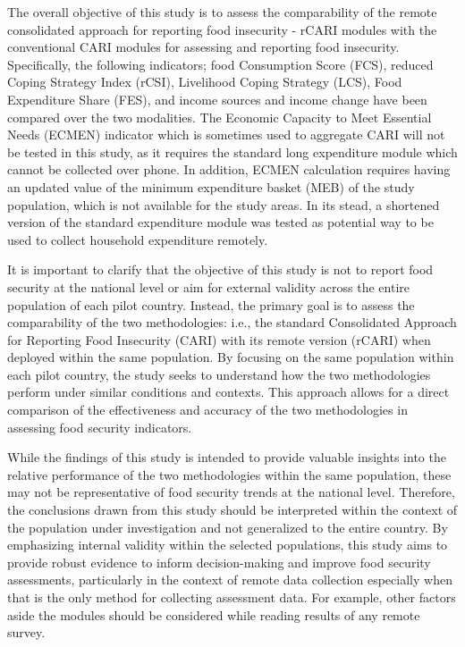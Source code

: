 \documentclass[11pt,harvard]{article}
\begin{document}
	The overall objective of this study is to assess the comparability of the remote consolidated approach for reporting food insecurity - rCARI modules with the conventional CARI modules for assessing and reporting food insecurity. Specifically, the following indicators; food Consumption Score (FCS), reduced Coping Strategy Index (rCSI), Livelihood Coping Strategy (LCS), Food Expenditure Share (FES), and income sources and income change have been compared over the two modalities. The Economic Capacity to Meet Essential Needs (ECMEN) indicator which is sometimes used to aggregate CARI will not be tested in this study, as it requires the standard long expenditure module which cannot be collected over phone. In addition, ECMEN calculation requires having an updated value of the minimum expenditure basket (MEB) of the study population, which is not available for the study areas. In its stead, a shortened version of the standard expenditure module was tested as potential way to be used to collect household expenditure remotely.
	
	It is important to clarify that the objective of this study is not to report food security at the national level or aim for external validity across the entire population of each pilot country. Instead, the primary goal is to assess the comparability of the two methodologies: i.e., the standard Consolidated Approach for Reporting Food Insecurity (CARI) with its remote version (rCARI) when deployed within the same population. By focusing on the same population within each pilot country, the study seeks to understand how the two methodologies perform under similar conditions and contexts. This approach allows for a direct comparison of the effectiveness and accuracy of the two methodologies in assessing food security indicators.
	
	While the findings of this study is intended to provide valuable insights into the relative performance of the two methodologies within the same population, these may not be representative of food security trends at the national level. Therefore, the conclusions drawn from this study should be interpreted within the context of the population under investigation and not generalized to the entire country. By emphasizing internal validity within the selected populations, this study aims to provide robust evidence to inform decision-making and improve food security assessments, particularly in the context of remote data collection especially when that is the only method for collecting assessment data. For example, other factors aside the modules should be considered while reading results of any remote survey.
	
\end{document}
